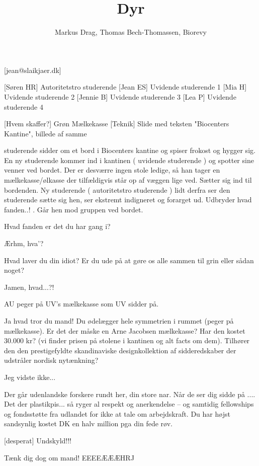 \documentclass[a4paper,12pt]{article}
\title{Dyr}
\author{Markus Drag, Thomas Bech-Thomassen, Biorevy}
\begin{document}
\maketitle

\begin{texxers}
	[jean@slaikjaer.dk]
\end{texxers}

\begin{roles}
	[Søren HR] Autoritetstro studerende
	[Jean ES] Uvidende studerende 1
	[Mia H] Uvidende studerende 2
	[Jennie B] Uvidende studerende 3
	[Lea P] Uvidende studerende 4
\end{roles}


\begin{props}
	[Hvem skaffer?] Grøn Mælkekasse
	[Teknik] Slide med teksten "Biocenters Kantine", billede af samme
\end{props}

\begin{sketch}

 studerende sidder om et bord i Biocenters kantine og spiser frokost og hygger sig. En ny studerende kommer ind i kantinen ( uvidende studerende ) og spotter sine venner ved bordet. Der er desværre ingen stole ledige, så han tager en mælkekasse/ølkasse der tilfældigvis står op af væggen lige ved. Sætter sig ind til bordenden.
Ny studerende ( autoritetstro studerende ) lidt derfra ser den studerende sætte sig hen, ser ekstremt indigneret og forarget ud. Udbryder  hvad fanden..! . Går hen mod gruppen ved bordet.

  Hvad fanden er det du har gang i? 

  Ærhm, hva'? 

  Hvad laver du din idiot? Er du ude på at gøre os alle sammen til grin eller sådan noget? 

  Jamen, hvad...?! 

\scene AU peger på UV's mælkekasse som UV sidder på.

  Ja hvad tror du mand! Du ødelægger hele symmetrien i rummet (peger på mælkekasse). Er det der måske en Arne Jacobsen mælkekasse? Har den kostet 30.000 kr? (vi finder prisen på stolene i kantinen og alt facts om dem). Tilhører den den prestigefyldte skandinaviske designkollektion af sidderedskaber der udstråler nordisk nytænkning?

  Jeg vidste ikke... 

  Der går udenlandske forskere rundt her, din store nar. Når de ser dig sidde på .... Det der plastikpis... så ryger al respekt og anerkendelse -- og samtidig fellowships og fondsstøtte fra udlandet for ikke at tale om arbejdskraft. Du har højst sandsynlig kostet DK en halv million pga din fede røv. 

[desperat]  Undskyld!!! 

  Tænk dig dog om mand! EEEEÆÆÆHRJ







\end{sketch}
\end{document}
